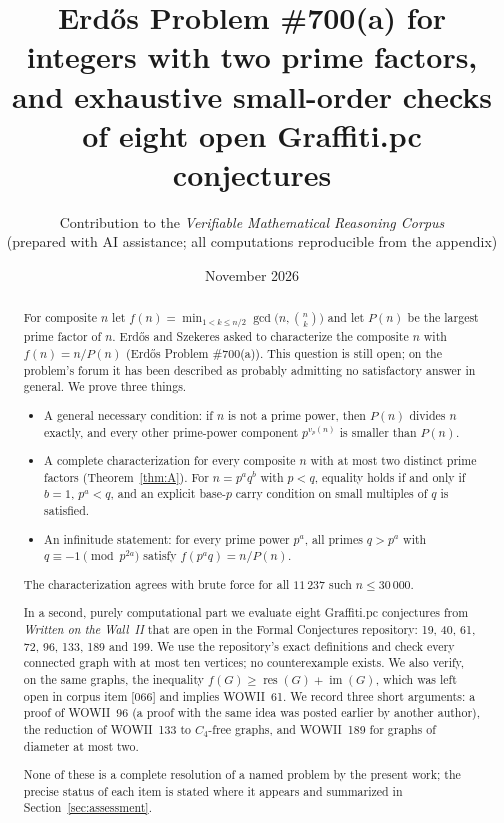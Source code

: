 \documentclass[11pt,a4paper]{article}
\title{Erd\H{o}s Problem \#700(a) for integers with two prime factors,\\
and exhaustive small-order checks of eight open Graffiti.pc conjectures}
\author{Contribution to the \emph{Verifiable Mathematical Reasoning Corpus}\\
\small (prepared with AI assistance; all computations reproducible from the appendix)}
\date{November 2026}
\theoremstyle{definition}
\newcommand{\res}{\operatorname{res}}
\newcommand{\im}{\operatorname{im}}
\begin{document}
\maketitle

\begin{abstract}
For composite $n$ let $f(n)=\min_{1<k\le n/2}\gcd\bigl(n,\binom nk\bigr)$ and let $P(n)$ be
the largest prime factor of $n$. Erd\H{o}s and Szekeres asked to characterize the composite
$n$ with $f(n)=n/P(n)$ (Erd\H{o}s Problem \#700(a)). This question is still open; on the
problem's forum it has been described as probably admitting no satisfactory answer in
general. We prove three things.
\begin{itemize}
\item A general necessary condition: if $n$ is not a prime power, then $P(n)$ divides $n$
  exactly, and every other prime-power component $p^{v_p(n)}$ is smaller than $P(n)$.
\item A complete characterization for every composite $n$ with at most two distinct prime
  factors (Theorem~\ref{thm:A}). For $n=p^aq^b$ with $p<q$, equality holds if and only if
  $b=1$, $p^a<q$, and an explicit base-$p$ carry condition on small multiples of $q$ is
  satisfied.
\item An infinitude statement: for every prime power $p^a$, all primes $q>p^a$ with
  $q\equiv-1\pmod{p^{2a}}$ satisfy $f(p^aq)=n/P(n)$.
\end{itemize}
The characterization agrees with brute force for all $11\,237$ such $n\le30\,000$.

In a second, purely computational part we evaluate eight Graffiti.pc conjectures from
\emph{Written on the Wall~II} that are open in the Formal Conjectures repository: 19, 40, 61,
72, 96, 133, 189 and 199. We use the repository's exact definitions and check every
connected graph with at most ten vertices; no counterexample exists. We also verify, on the
same graphs, the inequality $f(G)\ge\res(G)+\im(G)$, which was left open in corpus item
[066] and implies WOWII~61. We record three short arguments: a proof of WOWII~96 (a proof
with the same idea was posted earlier by another author), the reduction of WOWII~133 to
$C_4$-free graphs, and WOWII~189 for graphs of diameter at most two.

None of these is a complete resolution of a named problem by the present work; the precise
status of each item is stated where it appears and summarized in
Section~\ref{sec:assessment}.
\end{abstract}
\end{document}
